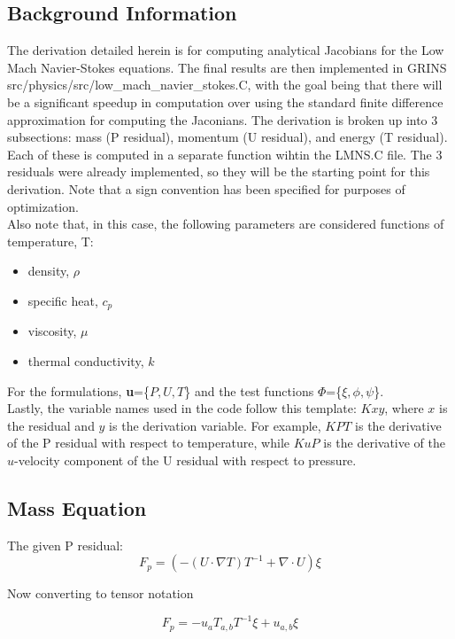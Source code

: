 \subsection{Background Information}
The derivation detailed herein is for computing analytical Jacobians for the Low Mach Navier-Stokes equations. The final results are then implemented in GRINS src/physics/src/low\_mach\_navier\_stokes.C, with the goal being that there
will be a significant speedup in computation over using the standard finite difference approximation for computing the Jaconians. The derivation is broken up into 3 subsections: mass (P residual), momentum (U residual), and energy (T residual).
Each of these is computed in a separate function wihtin the LMNS.C file.  The 3 residuals were already implemented, so they will be the starting point for this derivation. Note that a sign convention has been specified for 
purposes of optimization.\\
Also note that, in this case, the following parameters are considered functions of temperature, T:
\begin{itemize}
    \item density, $\rho$
    \item specific heat, $c_p$
    \item viscosity, $\mu$
    \item thermal conductivity, $k$
\end{itemize}
For the formulations, \textbf{u}=\{$P,U,T$\} and the test functions \textbf{$\Phi$}=\{$\xi,\phi,\psi$\}.\\
Lastly, the variable names used in the code follow this template: $Kxy$, where $x$ is the residual and $y$ is the derivation variable.  For example, $KPT$ is the derivative of the P residual with respect to temperature,
while $KuP$ is the derivative of the $u$-velocity component of the U residual with respect to pressure. 

\newpage
\subsection{Mass Equation}
The given P residual:
\begin{equation}
    F_p = (-(U \cdot \nabla T) T^{-1} + \nabla \cdot U)\xi
\end{equation}

Now converting to tensor notation

\begin{equation}
    F_p = -u_a T_{a,b} T^{-1} \xi + u_{a,b}\xi
\end{equation}

